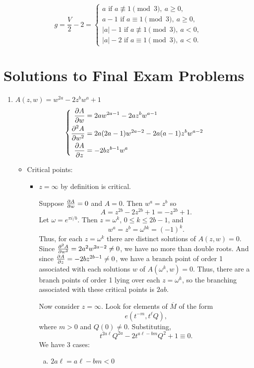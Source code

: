 \documentclass[a4paper,11pt]{article}
\begin{document}
\begin{mdframed}
\noindent
$$
g = \frac{V}{2} - 2 =
\begin{cases}
  a \text{ if } a \not\equiv 1 \pmod{3},\ a \ge 0,\\
  a - 1 \text{ if } a \equiv 1 \pmod{3},\ a \ge 0,\\
  |a| - 1 \text{ if } a \not\equiv 1 \pmod{3},\ a < 0,\\
  |a| - 2 \text{ if } a \equiv 1 \pmod{3},\ a < 0.
\end{cases}
$$
\end{mdframed}


\section{Solutions to Final Exam Problems}

\begin{enumerate}
\item $A(z,w) = w^{2a} - 2z^b w^a + 1$
  $$
  \left\{
    \begin{aligned}
      \frac{\partial A}{\partial w} &= 2aw^{2a-1} - 2az^b w^{a-1}\\
      \frac{\partial^2 A}{\partial w^2} &= 2a(2a-1)w^{2a-2} - 2a(a-1)z^b w^{a-2}\\
      \frac{\partial A}{\partial z} &= -2bz^{b-1} w^a
    \end{aligned}
  \right.
  $$
  \begin{itemize}
  \item Critical points:
    \begin{itemize}
    \item $z = \infty$ by definition is critical.

      Suppose $\frac{\partial A}{\partial w} = 0$ and $A = 0$.  Then $w^a = z^b$
      so
      $$
      A = z^{2b} - 2z^{2b} + 1 = -z^{2b} + 1.
      $$
      Let $\omega = e^{\pi i/b}$.  Then $z = \omega^k$, $0 \le k \le
      2b - 1$, and
      $$
      w^a = z^b = \omega^{bk} = (-1)^k.
      $$
      Thus, for each $z = \omega^k$ there are distinct solutions of
      $A(z,w) = 0$.  Since $\frac{\partial^2 A}{\partial w^2} = 2a^2 w^{2a-2} \ne
      0$, we have no more than double roots.  And since $\frac{\partial
        A}{\partial z} = -2bz^{2b-1} \ne 0$, we have a branch point of order
      1 associated with each solutions $w$ of $A(\omega^k, w) = 0$.
      Thus, there are a branch points of order 1 lying over each $z =
      \omega^k$, so the branching associated with these critical
      points is $2ab$.

      Now consider $z = \infty$.  Look for elements of $\overline{M}$
      of the form
      $$
      e(t^{-m}, t^\ell Q),
      $$
      where $m > 0$ and $Q(0) \ne 0$.  Substituting,
      $$
      t^{2a\ell} Q^{2a} - 2t^{a\ell-bm} Q^2 + 1 \equiv 0.
      $$
      We have 3 cases:
      \begin{enumerate}[(a)]
      \item \underline{$2a\ell = a\ell - bm < 0$}


\end{enumerate}
\end{itemize}
\end{itemize}
\end{enumerate}
\end{document}
